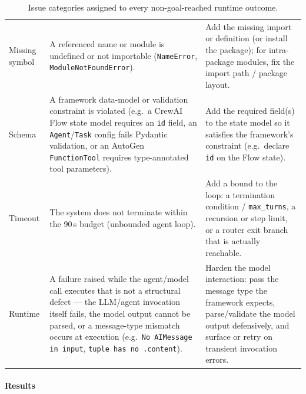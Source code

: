 \begin{table}[H]
\begin{tabular}{lp{4.7cm}p{5.0cm}}
\addlinespace
Missing symbol & A referenced name or module is undefined or not importable
                 (\texttt{NameError}, \texttt{ModuleNotFoundError}). &
                 Add the missing import or definition (or install the package); for
                 intra-package modules, fix the import path / package layout. \\
\addlinespace
Schema         & A framework data-model or validation constraint is violated
                 (e.g.\ a CrewAI Flow state model requires an \texttt{id} field,
                 an \texttt{Agent}/\texttt{Task} config fails Pydantic validation,
                 or an AutoGen \texttt{FunctionTool} requires type-annotated
                 tool parameters). &
                 Add the required field(s) to the state model so it satisfies the
                 framework's constraint (e.g.\ declare \texttt{id} on the Flow state). \\
\addlinespace
Timeout        & The system does not terminate within the 90\,s budget (unbounded
                 agent loop). &
                 Add a bound to the loop: a termination condition / \texttt{max\_turns},
                 a recursion or step limit, or a router exit branch that is actually reachable. \\
\addlinespace
Runtime        & A failure raised while the agent/model call executes that is not a
                 structural defect --- the LLM/agent invocation itself fails, the model
                 output cannot be parsed, or a message-type mismatch occurs at execution
                 (e.g.\ \texttt{No AIMessage in input}, \texttt{tuple has no .content}). &
                 Harden the model interaction: pass the message type the framework expects,
                 parse/validate the model output defensively, and surface or retry on
                 transient invocation errors. \\
\bottomrule
\end{tabular}
\caption{Issue categories assigned to every non-goal-reached runtime outcome.}
\label{tab:runtime-categories}
\end{table}

\paragraph{Results}

